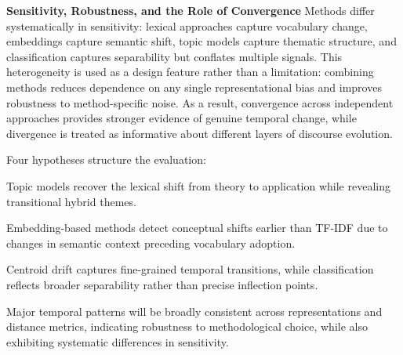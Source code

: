 \textbf{Sensitivity, Robustness, and the Role of Convergence}
Methods differ systematically in sensitivity: lexical approaches capture vocabulary change, embeddings capture semantic shift, topic models capture thematic structure, and classification captures separability but conflates multiple signals. This heterogeneity is used as a design feature rather than a limitation: combining methods reduces dependence on any single representational bias and improves robustness to method-specific noise. As a result, convergence across independent approaches provides stronger evidence of genuine temporal change, while divergence is treated as informative about different layers of discourse evolution.


\noindent Four hypotheses structure the evaluation:

\begin{description}[leftmargin=0pt]
\item[H1:] Topic models recover the lexical shift from theory to application while revealing transitional hybrid themes.
\item[H2:] Embedding-based methods detect conceptual shifts earlier than TF-IDF due to changes in semantic context preceding vocabulary adoption.
\item[H3:] Centroid drift captures fine-grained temporal transitions, while classification reflects broader separability rather than precise inflection points.
\item[H4:] Major temporal patterns will be broadly consistent across representations and distance metrics, indicating robustness to methodological choice, while also exhibiting systematic differences in sensitivity.
\end{description}
